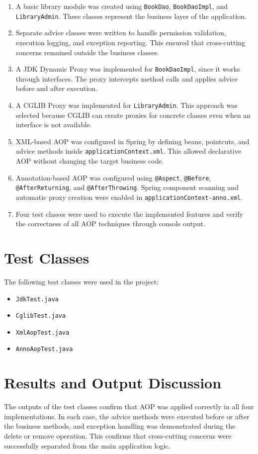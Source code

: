 \documentclass[12pt,a4paper]{article}
\begin{document}
\begin{enumerate}[label=\arabic*.]
    \item A basic library module was created using \texttt{BookDao}, \texttt{BookDaoImpl}, and \texttt{LibraryAdmin}. These classes represent the business layer of the application.
    \item Separate advice classes were written to handle permission validation, execution logging, and exception reporting. This ensured that cross-cutting concerns remained outside the business classes.
    \item A JDK Dynamic Proxy was implemented for \texttt{BookDaoImpl}, since it works through interfaces. The proxy intercepts method calls and applies advice before and after execution.
    \item A CGLIB Proxy was implemented for \texttt{LibraryAdmin}. This approach was selected because CGLIB can create proxies for concrete classes even when an interface is not available.
    \item XML-based AOP was configured in Spring by defining beans, pointcuts, and advice methods inside \texttt{applicationContext.xml}. This allowed declarative AOP without changing the target business code.
    \item Annotation-based AOP was configured using \texttt{@Aspect}, \texttt{@Before}, \texttt{@AfterReturning}, and \texttt{@AfterThrowing}. Spring component scanning and automatic proxy creation were enabled in \texttt{applicationContext-anno.xml}.
    \item Four test classes were used to execute the implemented features and verify the correctness of all AOP techniques through console output.
\end{enumerate}

\section*{Test Classes}
The following test classes were used in the project:
\begin{itemize}
    \item \texttt{JdkTest.java}
    \item \texttt{CglibTest.java}
    \item \texttt{XmlAopTest.java}
    \item \texttt{AnnoAopTest.java}
\end{itemize}

\section*{Results and Output Discussion}
The outputs of the test classes confirm that AOP was applied correctly in all four implementations. In each case, the advice methods were executed before or after the business methods, and exception handling was demonstrated during the delete or remove operation. This confirms that cross-cutting concerns were successfully separated from the main application logic.
\end{document}
